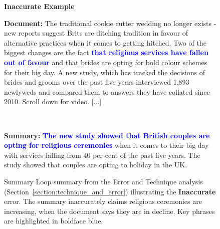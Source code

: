 \documentclass[11pt,a4paper]{article}
\begin{document}
\begin{figure*}[!htbp]
    \begin{framed}
        \begin{center}
            \large
            \textbf{Inaccurate Example}
        \end{center}

        \textbf{Document:}
        The traditional cookie cutter wedding no longer exists - new reports suggest Brits are ditching tradition in favour of alternative practices when it comes to getting hitched. Two of the biggest changes are the fact \textbf{\textcolor{blue}{that religious services have fallen out of favour}} and that brides are opting for bold colour schemes for their big day. A new study, which has tracked the decisions of brides and grooms over the past five years interviewed 1,893 newlyweds and compared them to answers they have collated since 2010. Scroll down for video. [...]
         \begin{center}
            ~
        \end{center}
        \textbf{Summary:}
        \textbf{\textcolor{blue}{The new study showed that British couples are opting for religious ceremonies}} when it comes to their big day with services falling from 40 per cent of the past five years. The study showed that couples are opting to holiday in the UK.
    \end{framed}

    \caption{Summary Loop summary from the Error and Technique analysis (Section~\ref{section:technique_and_error}) illustrating the \textbf{Inaccurate} error. The summary inaccurately claims religious ceremonies are increasing, when the document says they are in decline.  Key phrases are highlighted in boldface blue.}
    \label{fig:extra_examples5}
\end{figure*}
\end{document}
